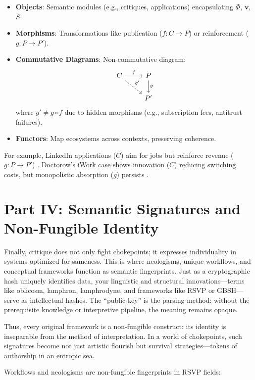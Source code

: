 \documentclass{article}
\begin{document}
\begin{itemize}
    \item \textbf{Objects}: Semantic modules (e.g., critiques, applications) encapsulating $\Phi$, $\mathbf{v}$, $S$.
    \item \textbf{Morphisms}: Transformations like publication ($f: C \to P$) or reinforcement ($g: P \to P'$).
    \item \textbf{Commutative Diagrams}: Non-commutative diagram:
    \[
    \begin{tikzcd}
        C \arrow[r, "f"] \arrow[rd, "g'", dashed] & P \arrow[d, "g"] \\
        & P'
    \end{tikzcd}
    \]
    where $g' \neq g \circ f$ due to hidden morphisms (e.g., subscription fees, antitrust failures).
    \item \textbf{Functors}: Map ecosystems across contexts, preserving coherence.
\end{itemize}

For example, LinkedIn applications ($C$) aim for jobs but reinforce revenue ($g: P \to P'$) \cite{ghedau2025linkedin}. Doctorow’s iWork case shows innovation ($C$) reducing switching costs, but monopolistic absorption ($g$) persists \cite{doctorow2023internetcon}.

\section{Part IV: Semantic Signatures and Non-Fungible Identity}

Finally, critique does not only fight chokepoints; it expresses individuality in systems optimized for sameness. This is where neologisms, unique workflows, and conceptual frameworks function as semantic fingerprints. Just as a cryptographic hash uniquely identifies data, your linguistic and structural innovations—terms like oblicosm, lamphron, lamphrodyne, and frameworks like RSVP or GBSH—serve as intellectual hashes. The “public key” is the parsing method: without the prerequisite knowledge or interpretive pipeline, the meaning remains opaque.

Thus, every original framework is a non-fungible construct: its identity is inseparable from the method of interpretation. In a world of chokepoints, such signatures become not just artistic flourish but survival strategies—tokens of authorship in an entropic sea.

Workflows and neologisms are non-fungible fingerprints in RSVP fields:
\end{document}
